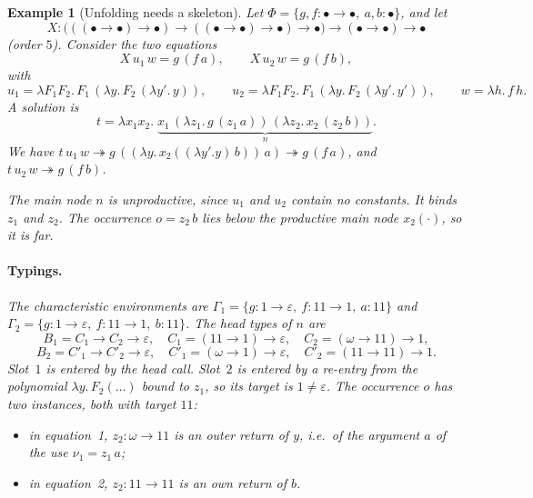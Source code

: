 \documentclass[10pt,a4paper]{article}
\theoremstyle{plain}%
\newtheorem{example}[theorem]{Example}
\begin{document}
\begin{example}[Unfolding needs a skeleton]\label{ex:fifth-skeleton}
Let $\Phi = \{g, f : \bullet \to \bullet,\ a, b : \bullet\}$, and let
\[
X : \big(((\bullet\to\bullet)\to\bullet) \to ((\bullet\to\bullet)\to\bullet) \to \bullet\big) \to (\bullet \to \bullet) \to \bullet
\]
(order $5$).
Consider the two equations
\[
X\,u_1\,w = g\,(f\,a), \qquad X\,u_2\,w = g\,(f\,b),
\]
with
\[
u_1 = \lambda F_1 F_2.\,F_1\,(\lambda y.\,F_2\,(\lambda y'.\,y)),
\qquad
u_2 = \lambda F_1 F_2.\,F_1\,(\lambda y.\,F_2\,(\lambda y'.\,y')),
\qquad
w = \lambda h.\,f\,h .
\]
A solution is
\[
t = \lambda x_1 x_2.\; \underbrace{x_1\,(\lambda z_1.\,g\,(z_1\,a))\,(\lambda z_2.\,x_2\,(z_2\,b))}_{n} .
\]
We have $t\,u_1\,w \twoheadrightarrow g\,((\lambda y.\,x_2((\lambda y'.y)\,b))\,a) \twoheadrightarrow g\,(f\,a)$, and  $t\,u_2\,w \twoheadrightarrow g\,(f\,b)$.

The main node $n$ is unproductive, since $u_1$ and $u_2$ contain no constants.
It binds $z_1$ and $z_2$.
The occurrence $o = z_2\,b$ lies below the productive main node $x_2(\cdot)$, so it is far.

\paragraph{Typings.}
The characteristic environments are $\Gamma_1 = \{g : 1 \to \varepsilon,\ f : 11 \to 1,\ a : 11\}$ and $\Gamma_2 = \{g : 1 \to \varepsilon,\ f : 11 \to 1,\ b : 11\}$.
The head types of $n$ are
\[
B_1 = C_1 \to C_2 \to \varepsilon,
\quad C_1 = (11 \to 1) \to \varepsilon,
\quad C_2 = (\omega \to 11) \to 1,
\]
\[
B_2 = C'_1 \to C'_2 \to \varepsilon,
\quad C'_1 = (\omega \to 1) \to \varepsilon,
\quad C'_2 = (11 \to 11) \to 1 .
\]
Slot~$1$ is entered by the head call.
Slot~$2$ is entered by a re-entry from the polynomial $\lambda y.\,F_2(\ldots)$ bound to $z_1$, so its target is $1 \neq \varepsilon$.
The occurrence $o$ has two instances, both with target $11$:
\begin{itemize}
\item in equation~1, $z_2 : \omega \to 11$ is an \emph{outer} return of $y$, i.e.\ of the argument $a$ of the use $\nu_1 = z_1\,a$;
\item in equation~2, $z_2 : 11 \to 11$ is an \emph{own} return of $b$.
\end{itemize}


\end{example}
\end{document}
